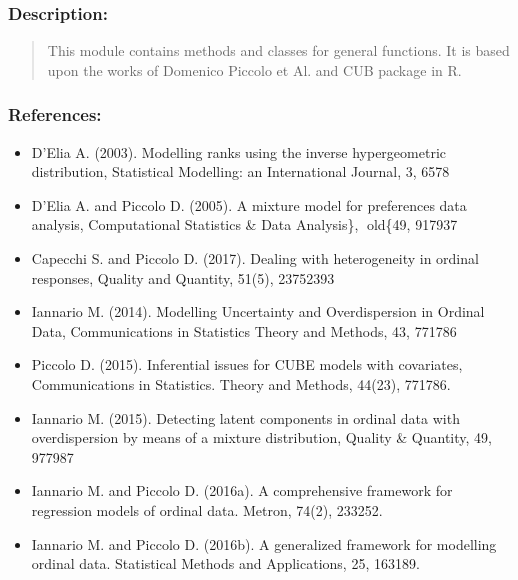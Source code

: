 \documentclass[letterpaper,10pt,english]{sphinxmanual}
\begin{document}
\subsubsection{Description:}
\label{\detokenize{cubmods:id245}}\begin{quote}

\sphinxAtStartPar
This module contains methods and classes
for general functions.
It is based upon the works of Domenico
Piccolo et Al. and CUB package in R.
\end{quote}


\subsubsection{References:}
\label{\detokenize{cubmods:id246}}\begin{itemize}
\item {} 
\sphinxAtStartPar
D’Elia A. (2003). Modelling ranks using the inverse hypergeometric distribution, Statistical Modelling: an International Journal, 3, 65\textendash{}78

\item {} 
\sphinxAtStartPar
D’Elia A. and Piccolo D. (2005). A mixture model for preferences data analysis, Computational Statistics \& Data Analysis\},  old\{49, 917\textendash{}937

\item {} 
\sphinxAtStartPar
Capecchi S. and Piccolo D. (2017). Dealing with heterogeneity in ordinal responses, Quality and Quantity, 51(5), 2375\textendash{}2393

\item {} 
\sphinxAtStartPar
Iannario M. (2014). Modelling Uncertainty and Overdispersion in Ordinal Data, Communications in Statistics \sphinxhyphen{} Theory and Methods, 43, 771\textendash{}786

\item {} 
\sphinxAtStartPar
Piccolo D. (2015). Inferential issues for CUBE models with covariates, Communications in Statistics. Theory and Methods, 44(23), 771\textendash{}786.

\item {} 
\sphinxAtStartPar
Iannario M. (2015). Detecting latent components in ordinal data with overdispersion by means of a mixture distribution, Quality \& Quantity, 49, 977\textendash{}987

\item {} 
\sphinxAtStartPar
Iannario M. and Piccolo D. (2016a). A comprehensive framework for regression models of ordinal data. Metron, 74(2), 233\textendash{}252.

\item {} 
\sphinxAtStartPar
Iannario M. and Piccolo D. (2016b). A generalized framework for modelling ordinal data. Statistical Methods and Applications, 25, 163\textendash{}189.

\end{itemize}
\end{document}
